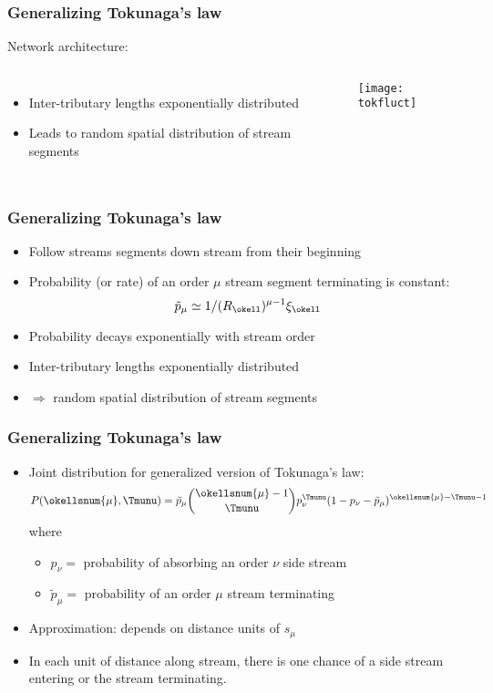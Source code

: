\begin{frame}[label=]
  \frametitle{Generalizing Tokunaga's law}

  \begin{block}{Network architecture:}
    \begin{columns}
      \begin{itemize}
      \item 
        Inter-tributary lengths exponentially distributed
      \item 
        Leads to random spatial distribution of stream segments
      \end{itemize}
      \texttt{[image: tokfluct]}
    \end{columns}
  \end{block}

\end{frame}

\begin{frame}[label=]
  \frametitle{Generalizing Tokunaga's law}

  \begin{itemize}
  \item<1->
    Follow streams segments down stream from their beginning
  \item<2->
    Probability (or rate) of an order $\mu$ stream segment terminating is \alert{constant}:
    $$
    \tilde{p}_{\mu} \simeq 1/(R_\okell)^{\mu-1}\xi_\okell 
    $$
  \item<3-> 
    Probability decays exponentially with stream order
  \item<4->
    Inter-tributary lengths exponentially distributed
  \item<5->
    $\Rightarrow$ random spatial distribution of stream segments
  \end{itemize}
\end{frame}

\begin{frame}[label=]
  \frametitle{Generalizing Tokunaga's law}

  \begin{itemize}
  \item<1-> Joint distribution for generalized version
    of Tokunaga's law:
    $$
    P(\okellsnum{\mu},\Tmunu) = \tilde{p}_{\mu}
    \binom{\okellsnum{\mu} - 1}{\Tmunu}
    p_{\nu}^{\Tmunu}
    ( 1 - p_\nu - \tilde{p}_{\mu})^{\okellsnum{\mu} - \Tmunu - 1}
    $$
    where 
    \begin{itemize}
    \item<1-> $p_\nu = $ probability of absorbing an order $\nu$ side stream
    \item<2-> $\tilde{p}_{\mu} = $ probability of an order $\mu$ stream terminating 
    \end{itemize}
  \item<3-> Approximation: depends on distance units of $s_\mu$
  \item<3-> In each unit of distance along stream, there is 
    one chance of a side stream entering or the stream terminating.
  \end{itemize}

\end{frame}

